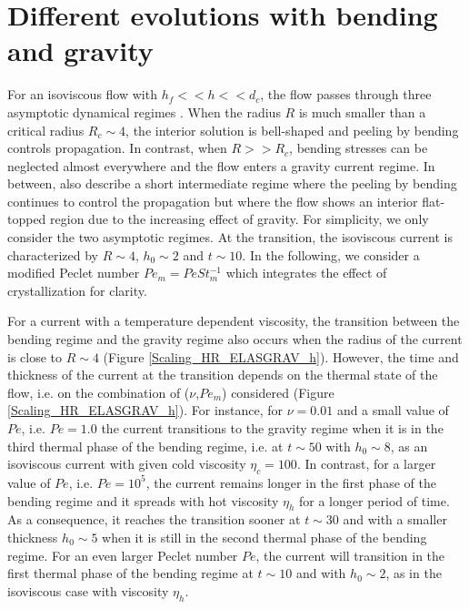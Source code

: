 \section{Different evolutions with bending and gravity}
\label{sec:diff-evol-with-1}

For an isoviscous  flow with $h_f<< h<< d_c$, the  flow passes through
three             asymptotic             dynamical             regimes
\citep{Michaut:2011kg,Lister:2013ia}.   When the  radius  $R$ is  much
smaller than a  critical radius $R_c\sim 4$, the  interior solution is
bell-shaped and peeling by bending controls propagation.  In contrast,
when $R>>R_c$, bending stresses can be neglected almost everywhere and
the   flow   enters   a   gravity   current   regime.    In   between,
\citet{Lister:2013ia} also describe a  short intermediate regime where
the peeling by bending continues  to control the propagation but where
the flow  shows an interior  flat-topped region due to  the increasing
effect of gravity. For simplicity, we only consider the two asymptotic
regimes. At the transition, the isoviscous current is characterized by
$R\sim4$, $h_0 \sim 2$ and $t  \sim 10$. In the following, we consider
a modified  Peclet number $Pe_m  = Pe St_m^{-1}$ which  integrates the
effect of crystallization for clarity.

For a current  with a temperature dependent  viscosity, the transition
between the bending regime and the gravity regime also occurs when the
radius   of   the   current   is    close   to   $R\sim   4$   (Figure
\ref{Scaling_HR_ELASGRAV_h}). However,  the time and thickness  of the
current at  the transition depends on  the thermal state of  the flow,
i.e.   on   the  combination  of  ($\nu$,$Pe_m$)   considered  (Figure
\ref{Scaling_HR_ELASGRAV_h}).   For  instance,  for $\nu=0.01$  and  a
small value of  $Pe$, i.e.  $Pe = 1.0$ the  current transitions to the
gravity regime  when it is in  the third thermal phase  of the bending
regime,  i.e. at  $t \sim  50$  with $h_0  \sim 8$,  as an  isoviscous
current with  given cold viscosity  $\eta_c=100$.  In contrast,  for a
larger value of  $Pe$, i.e. $Pe= 10^5$, the current  remains longer in
the  first  phase of  the  bending  regime  and  it spreads  with  hot
viscosity $\eta_h$ for a longer period  of time.  As a consequence, it
reaches  the  transition sooner  at  $t\sim  30$  and with  a  smaller
thickness $h_0\sim 5$ when it is  still in the second thermal phase of
the  bending regime.   For  an  even larger  Peclet  number $Pe$,  the
current  will transition  in the  first thermal  phase of  the bending
regime at $t \sim 10$ and with $h_0 \sim 2$, as in the isoviscous case
with viscosity $\eta_h$.

